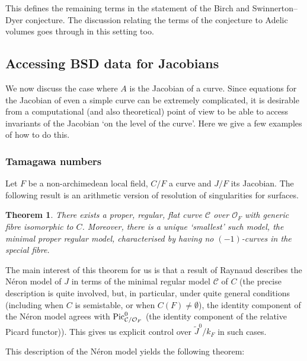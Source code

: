 \documentclass[12pt]{amsart}
\numberwithin{equation}{section}
\newtheorem{theorem}[equation]{Theorem}
\theoremstyle{remark}
\theoremstyle{definition}
\theoremstyle{definition}
\theoremstyle{definition}
\theoremstyle{definition}
\theoremstyle{definition}
\theoremstyle{definition}
\theoremstyle{definition}
\begin{document}
This defines the remaining terms in the statement of the Birch and Swinnerton--Dyer conjecture. The discussion relating the terms of the conjecture to Adelic volumes goes through in this setting too. 


\subsection{Accessing BSD data for Jacobians}

We now discuss the case where $A$ is the Jacobian of a curve. Since equations for the Jacobian of even a simple curve can  be extremely complicated, it is desirable from a computational (and also theoretical) point of view to be able to access invariants of the Jacobian `on the level of the curve'. Here we give a few examples of how to do this.

\subsubsection{Tamagawa numbers}
Let $F$ be a non-archimedean local field, $C/F$ a curve and $J/F$ its Jacobian. The following result is an arithmetic version of resolution of singularities for surfaces. 

\begin{theorem}
There exists a proper, regular, flat curve $\mathcal{C}$ over $\mathcal{O}_F$ with generic fibre isomorphic to $C$. Moreover, there is a unique `smallest' such model, the \textit{minimal proper regular model}, characterised by having no $(-1)$-curves in the special fibre. 
\end{theorem}

The main interest of this theorem for us is that a result of Raynaud \cite[Theorem 9.5.4]{MR1045822} describes the N\'{e}ron model of $J$ in terms of the minimal regular model $\mathcal{C}$ of $C$ (the precise description is quite involved, but, in particular, under quite general conditions (including when $C$ is semistable, or when $C(F)\neq \emptyset$), the identity component of the N\'{e}ron model agrees with $\textup{Pic}^0_{\mathcal{C}/\mathcal{O}_F}$ (the identity component of the relative Picard functor)). This gives us explicit control over $\tilde{J}^0/k_F$ in such cases.

 This description of the N\'{e}ron model yields the following theorem:
 
\end{document}
